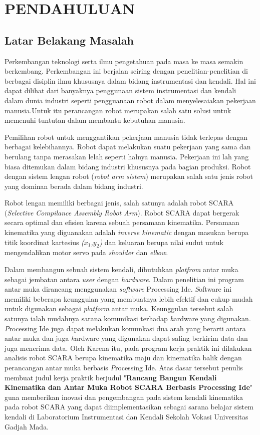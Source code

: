 
\chapter{PENDAHULUAN}

\section{Latar Belakang Masalah}

	Perkembangan teknologi serta ilmu pengetahuan pada masa ke masa semakin berkembang. Perkembangan ini berjalan seiring dengan penelitian-penelitian di berbagai disiplin ilmu khususnya dalam bidang instrumentasi dan kendali. Hal ini dapat dilihat dari banyaknya penggunaan sistem instrumentasi dan kendali dalam dunia industri seperti pengguanaan robot dalam menyelesaiakan pekerjaan manusia.Untuk itu perancangan robot merupakan salah satu solusi untuk memenuhi tuntutan dalam membantu kebutuhan manusia.
	
	Pemilihan robot untuk menggantikan pekerjaan manusia tidak terlepas dengan berbagai kelebihannya. Robot dapat melakukan suatu pekerjaan yang sama dan berulang tanpa merasakan lelah seperti halnya manusia. Pekerjaan ini lah yang biasa ditemukan dalam bidang industri khususnya pada bagian produksi. Robot dengan sistem lengan robot (\emph {robot arm sistem}) merupakan salah satu jenis robot yang dominan berada dalam bidang industri. 
	
	Robot lengan memiliki berbagai jenis, salah satunya adalah robot SCARA (\emph{Selective Compilance Assembly Robot Arm}). Robot SCARA dapat bergerak secara optimal dan efisien karena sebuah persamaan kinematika. Persamaan kinematika yang diguanakan adalah \textit{inverse kinematic} dengan masukan berupa titik koordinat kartesius \textit{($x_{1}$,$y_{2}$)} dan keluaran berupa nilai sudut untuk mengendalikan motor servo pada \textit{shoulder} dan \textit{elbow}.
	
	Dalam membangun sebuah sistem kendali, dibutuhkan \textit{platfrom} antar muka sebagai jembatan antara \textit{user} dengan \textit{hardware}. Dalam penelitian ini program antar muka dirancang menggunakan \textit{software} Processing Ide. \emph Software ini memiliki beberapa keunggulan yang membuatnya lebih efektif dan cukup mudah untuk digunakan sebagai \textit{platform} antar muka. Keunggulan tersebut salah satunya ialah mudahnya sarana komunikasi terhadap \emph hardware yang digunakan. \emph Processing Ide juga dapat melakukan komunkasi dua arah yang berarti antara antar muka dan juga \emph hardware yang digunakan dapat saling berkirim data dan juga menerima data.
	Oleh Karena itu, pada program kerja praktik ini dilakukan analisis robot SCARA berupa kinematika maju dan kinematika balik dengan perancangan antar muka berbasis \emph Processing Ide. Atas dasar tersebut penulis membuat judul kerja praktik berjudul "\textbf{Rancang Bangun Kendali Kinematika dan Antar Muka Robot SCARA Berbasis Processing Ide}" guna memberikan inovasi dan pengembangan pada sistem kendali kinematika pada robot SCARA yang dapat diimplementasikan sebagai sarana belajar sistem kendali di Laboratorium Instrumentasi dan Kendali Sekolah Vokasi Universitas Gadjah Mada.\\


